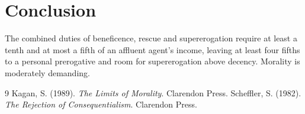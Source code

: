 \documentclass{situationist-preprint}
\begin{document}
\section{Conclusion}

The combined duties of beneficence, rescue and supererogation require at least a tenth and at most a fifth of an affluent agent's income, leaving at least four fifths to a personal prerogative and room for supererogation above decency. Morality is moderately demanding.

\begin{thebibliography}{9}\small
{} Kagan, S. (1989). \emph{The Limits of Morality}. Clarendon Press.
 Scheffler, S. (1982). \emph{The Rejection of Consequentialism}. Clarendon Press.
\end{thebibliography}
\end{document}
